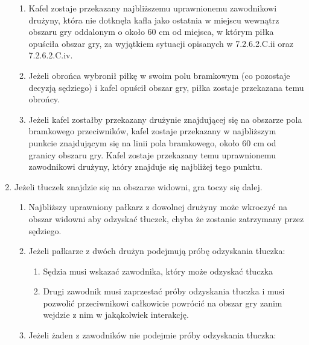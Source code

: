 \documentclass[12pt]{article}
\begin{document}
\begin{enumerate}
	      \begin{enumerate}
		      \item
		            Kafel zostaje przekazany najbliższemu uprawnionemu zawodnikowi
		            drużyny, która nie dotknęła kafla jako ostatnia w miejscu wewnątrz
		            obszaru gry oddalonym o około 60 cm od miejsca, w którym piłka
		            opuściła obszar gry, za wyjątkiem sytuacji opisanych w 7.2.6.2.C.ii
		            oraz 7.2.6.2.C.iv.
		      \item
		            Jeżeli obrońca wybronił piłkę w swoim polu bramkowym (co pozostaje
		            decyzją sędziego) i kafel opuścił obszar gry, piłka zostaje
		            przekazana temu obrońcy.
		      \item
		            Jeżeli kafel zostałby przekazany drużynie znajdującej się na
		            obszarze pola bramkowego przeciwników, kafel zostaje przekazany w
		            najbliższym punkcie znajdującym się na linii pola bramkowego, około
		            60 cm od granicy obszaru gry. Kafel zostaje przekazany temu
		            uprawnionemu zawodnikowi drużyny, który znajduje się najbliżej tego
		            punktu.
	      \end{enumerate}
	\item
	      Jeżeli tłuczek znajdzie się na obszarze widowni, gra toczy się dalej.

	      \begin{enumerate}
		      \item
		            Najbliższy uprawniony pałkarz z dowolnej drużyny może wkroczyć na
		            obszar widowni aby odzyskać tłuczek, chyba że zostanie zatrzymany
		            przez sędziego.
		      \item
		            Jeżeli pałkarze z dwóch drużyn podejmują próbę odzyskania tłuczka:

		            \begin{enumerate}
			            \item
			                  Sędzia musi wskazać zawodnika, który może odzyskać tłuczka
			            \item
			                  Drugi zawodnik musi zaprzestać próby odzyskania tłuczka i musi
			                  pozwolić przeciwnikowi całkowicie powrócić na obszar gry zanim
			                  wejdzie z nim w jakąkolwiek interakcję.
		            \end{enumerate}
		      \item
		            Jeżeli żaden z zawodników nie podejmie próby odzyskania tłuczka:


\end{enumerate}
\end{enumerate}
\end{document}
